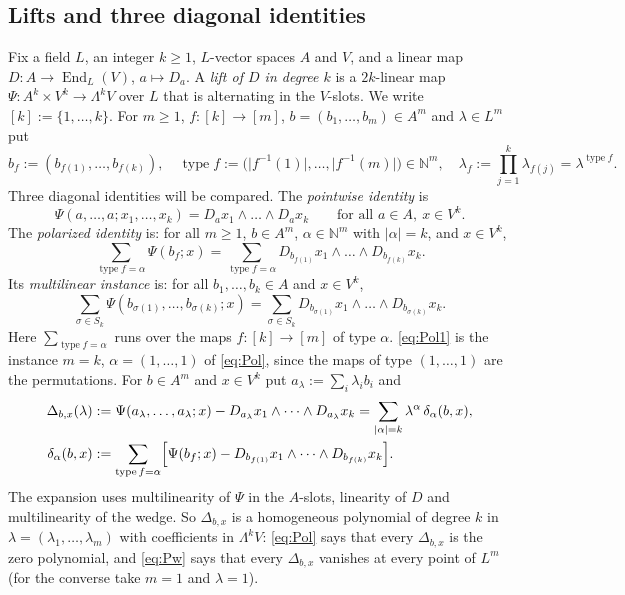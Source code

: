 \documentclass[11pt]{amsart}
\theoremstyle{definition}
\theoremstyle{remark}
\numberwithin{equation}{section}
\newcommand{\N}{\mathbb{N}}
\newcommand{\End}{\operatorname{End}}
\newcommand{\type}{\operatorname{type}}
\newcommand{\abs}[1]{\lvert #1\rvert}
\begin{document}
\subsection{Lifts and three diagonal identities}\label{ssec:diag}
Fix a field $L$, an integer $k\ge1$, $L$\nobreakdash-vector spaces $A$ and $V$, and a linear map $D\colon A\to\End_L(V)$,
$a\mapsto D_a$. A \emph{lift of $D$ in degree $k$} is a $2k$\nobreakdash-linear map $\Psi\colon A^k\times V^k\to\Lambda^kV$ over $L$ that is
alternating in the $V$\nobreakdash-slots. We write $[k]:=\{1,\dots,k\}$. For $m\ge1$, $f\colon[k]\to[m]$, $b=(b_1,\dots,b_m)\in A^m$
and $\lambda\in L^m$ put
\[
b_f:=(b_{f(1)},\dots,b_{f(k)}),\quad \type f:=\bigl(\abs{f^{-1}(1)},\dots,\abs{f^{-1}(m)}\bigr)\in\N^m,\quad
\lambda_f:=\prod_{j=1}^k\lambda_{f(j)}=\lambda^{\type f}.
\]
Three diagonal identities will be compared. The \emph{pointwise identity} is
\begin{equation*}\tag{Pw}\label{eq:Pw}
\Psi(a,\dots,a;x_1,\dots,x_k)=D_ax_1\wedge\dots\wedge D_ax_k\qquad\text{for all }a\in A,\ x\in V^k.
\end{equation*}
The \emph{polarized identity} is: for all $m\ge1$, $b\in A^m$, $\alpha\in\N^m$ with $\abs\alpha=k$, and $x\in V^k$,
\begin{equation*}\tag{Pol}\label{eq:Pol}
\sum_{\type f=\alpha}\Psi(b_f;x)=\sum_{\type f=\alpha}D_{b_{f(1)}}x_1\wedge\dots\wedge D_{b_{f(k)}}x_k .
\end{equation*}
Its \emph{multilinear instance} is: for all $b_1,\dots,b_k\in A$ and $x\in V^k$,
\begin{equation*}\tag{Pol1}\label{eq:Pol1}
\sum_{\sigma\in S_k}\Psi(b_{\sigma(1)},\dots,b_{\sigma(k)};x)
=\sum_{\sigma\in S_k}D_{b_{\sigma(1)}}x_1\wedge\dots\wedge D_{b_{\sigma(k)}}x_k .
\end{equation*}
Here $\sum_{\type f=\alpha}$ runs over the maps $f\colon[k]\to[m]$ of type $\alpha$. \eqref{eq:Pol1} is the instance $m=k$,
$\alpha=(1,\dots,1)$ of \eqref{eq:Pol}, since the maps of type $(1,\dots,1)$ are the permutations. For $b\in A^m$ and
$x\in V^k$ put $a_\lambda:=\sum_i\lambda_ib_i$ and
\begin{align*}
\Delta_{b,x}(\lambda)&:=\Psi(a_\lambda,\dots,a_\lambda;x)-D_{a_\lambda}x_1\wedge\dots\wedge D_{a_\lambda}x_k
=\sum_{\abs\alpha=k}\lambda^\alpha\,\delta_\alpha(b,x),\\
\delta_\alpha(b,x)&:=\sum_{\type f=\alpha}\Bigl[\Psi(b_f;x)-D_{b_{f(1)}}x_1\wedge\dots\wedge D_{b_{f(k)}}x_k\Bigr].
\end{align*}
The expansion uses multilinearity of $\Psi$ in the $A$\nobreakdash-slots, linearity of $D$ and multilinearity of the wedge. So
$\Delta_{b,x}$ is a homogeneous polynomial of degree $k$ in $\lambda=(\lambda_1,\dots,\lambda_m)$ with coefficients in
$\Lambda^kV$: \eqref{eq:Pol} says that every $\Delta_{b,x}$ is the zero polynomial, and \eqref{eq:Pw} says that every $\Delta_{b,x}$
vanishes at every point of $L^m$ (for the converse take $m=1$ and $\lambda=1$).
\end{document}
